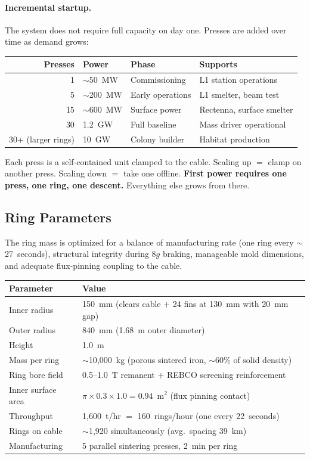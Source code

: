 \documentclass[12pt,letterpaper]{article}
\begin{document}
\paragraph{Incremental startup.}
The system does not require full capacity on day one. Presses are added over time as demand grows:

\begin{center}
\small
\begin{tabular}{rlll}
\toprule
\textbf{Presses} & \textbf{Power} & \textbf{Phase} & \textbf{Supports} \\
\midrule
1 & $\sim$50~MW & Commissioning & L1 station operations \\
5 & $\sim$200~MW & Early operations & L1 smelter, beam test \\
15 & $\sim$600~MW & Surface power & Rectenna, surface smelter \\
30 & 1.2~GW & Full baseline & Mass driver operational \\
30+ (larger rings) & 10~GW & Colony builder & Habitat production \\
\bottomrule
\end{tabular}
\end{center}

\noindent Each press is a self-contained unit clamped to the cable. Scaling up $=$ clamp on another press. Scaling down $=$ take one offline. \textbf{First power requires one press, one ring, one descent.} Everything else grows from there.

\subsection{Ring Parameters}

The ring mass is optimized for a balance of manufacturing rate (one ring every ${\sim}$27~seconds), structural integrity during 8$g$ braking, manageable mold dimensions, and adequate flux-pinning coupling to the cable.

\begin{center}
\small
\begin{tabular}{ll}
\toprule
\textbf{Parameter} & \textbf{Value} \\
\midrule
Inner radius & 150~mm (clears cable + 24 fins at 130~mm with 20~mm gap) \\
Outer radius & 840~mm (1.68~m outer diameter) \\
Height & 1.0~m \\
Mass per ring & ${\sim}$10{,}000~kg (porous sintered iron, ${\sim}$60\% of solid density) \\
Ring bore field & 0.5--1.0~T remanent $+$ REBCO screening reinforcement \\
Inner surface area & $\pi \times 0.3 \times 1.0 = 0.94$~m$^2$ (flux pinning contact) \\
Throughput & 1,600~t/hr $=$ 160~rings/hour (one every 22~seconds) \\
Rings on cable & ${\sim}$1{,}920 simultaneously (avg.\ spacing 39~km) \\
Manufacturing & 5 parallel sintering presses, 2~min per ring \\
\bottomrule
\end{tabular}
\end{center}
\end{document}
